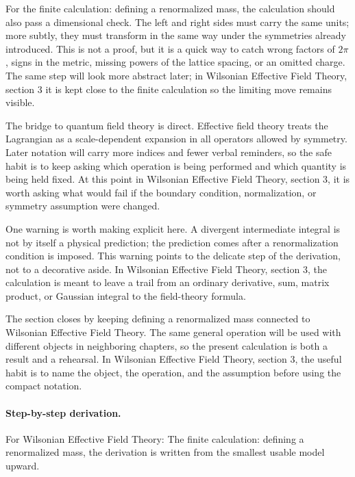 For the finite calculation: defining a renormalized mass, the calculation should also pass a dimensional check.  The left and right sides must carry the same units; more subtly, they must transform in the same way under the symmetries already introduced.  This is not a proof, but it is a quick way to catch wrong factors of \(2\pi\), signs in the metric, missing powers of the lattice spacing, or an omitted charge.  The same step will look more abstract later; in Wilsonian Effective Field Theory, section 3 it is kept close to the finite calculation so the limiting move remains visible.

The bridge to quantum field theory is direct.  Effective field theory treats the Lagrangian as a scale-dependent expansion in all operators allowed by symmetry.  Later notation will carry more indices and fewer verbal reminders, so the safe habit is to keep asking which operation is being performed and which quantity is being held fixed.  At this point in Wilsonian Effective Field Theory, section 3, it is worth asking what would fail if the boundary condition, normalization, or symmetry assumption were changed.

One warning is worth making explicit here.  A divergent intermediate integral is not by itself a physical prediction; the prediction comes after a renormalization condition is imposed.  This warning points to the delicate step of the derivation, not to a decorative aside.  In Wilsonian Effective Field Theory, section 3, the calculation is meant to leave a trail from an ordinary derivative, sum, matrix product, or Gaussian integral to the field-theory formula.

The section closes by keeping defining a renormalized mass connected to Wilsonian Effective Field Theory.  The same general operation will be used with different objects in neighboring chapters, so the present calculation is both a result and a rehearsal.  In Wilsonian Effective Field Theory, section 3, the useful habit is to name the object, the operation, and the assumption before using the compact notation.



\paragraph{Step-by-step derivation.}

For Wilsonian Effective Field Theory: The finite calculation: defining a renormalized mass, the derivation is written from the smallest usable model upward.

